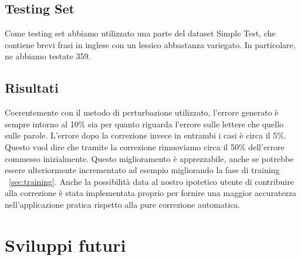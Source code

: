 \subsection{Testing Set}
Come testing set abbiamo utilizzato una parte del dataset Simple Test, che contiene brevi frasi in inglese con un lessico abbastanza variegato. In particolare, ne abbiamo testate 359.  

\subsection{Risultati}
Coerentemente con il metodo di perturbazione utilizzato, l'errore generato è sempre intorno al 10\% sia per quanto riguarda l'errore sulle lettere che quello sulle parole. L'errore dopo la correzione invece in entrambi i casi è circa il 5\%. Questo vuol dire che tramite la correzione rimuoviamo circa il 50\% dell'errore commesso inizialmente. Questo miglioramento è apprezzabile, anche se potrebbe essere ulteriormente incrementato ad esempio migliorando la fase di training ~\ref{sec:training}. Anche la possibilità data al nostro ipotetico utente di contribuire alla correzione è stata implementata proprio per fornire una maggior accuratezza nell'applicazione pratica rispetto alla pure correzione automatica.

\section{Sviluppi futuri}